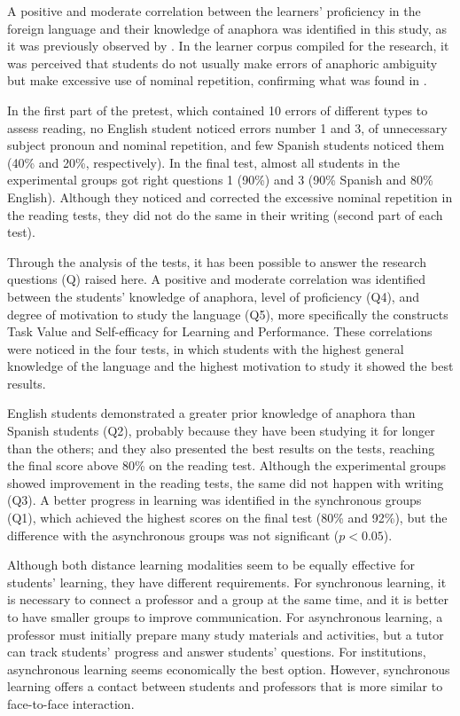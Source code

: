 \documentclass{textolivre}
\begin{document}
A positive and moderate correlation between the learners' proficiency in
the foreign language and their knowledge of anaphora was identified in
this study, as it was previously observed by \textcite{pretorius_english_2005}. In the
learner corpus compiled for the research, it was perceived that
students do not usually make errors of anaphoric ambiguity but make
excessive use of nominal repetition, confirming what was found in \textcite{lozano_2016}.

In the first part of the pretest, which contained 10 errors of different
types to assess reading, no English student noticed errors number 1 and
3, of unnecessary subject pronoun and nominal repetition, and few
Spanish students noticed them (40\% and 20\%, respectively). In the
final test, almost all students in the experimental groups got right
questions 1 (90\%) and 3 (90\% Spanish and 80\% English). Although they
noticed and corrected the excessive nominal repetition in the reading
tests, they did not do the same in their writing (second part of each
test).

Through the analysis of the tests, it has been possible to answer the
research questions (Q) raised here. A positive and moderate correlation
was identified between the students' knowledge of anaphora, level of
proficiency (Q4), and degree of motivation to study the language (Q5),
more specifically the constructs Task Value and Self-efficacy for
Learning and Performance. These correlations were noticed in the four
tests, in which students with the highest general knowledge of the
language and the highest motivation to study it showed the best results.

English students demonstrated a greater prior knowledge of anaphora than
Spanish students (Q2), probably because they have been studying it for
longer than the others; and they also presented the best results on the
tests, reaching the final score above 80\% on the reading test. Although
the experimental groups showed improvement in the reading tests, the
same did not happen with writing (Q3). A better progress in learning was
identified in the synchronous groups (Q1), which achieved the highest
scores on the final test (80\% and 92\%), but the difference with the
asynchronous groups was not significant ($p < 0.05$).

Although both distance learning modalities seem to be equally effective
for students' learning, they have different requirements. For
synchronous learning, it is necessary to connect a professor and a group
at the same time, and it is better to have smaller groups to improve
communication. For asynchronous learning, a professor must initially
prepare many study materials and activities, but a tutor can track
students' progress and answer students' questions. For institutions,
asynchronous learning seems economically the best option. However,
synchronous learning offers a contact between students and professors
that is more similar to face-to-face interaction.
\end{document}
